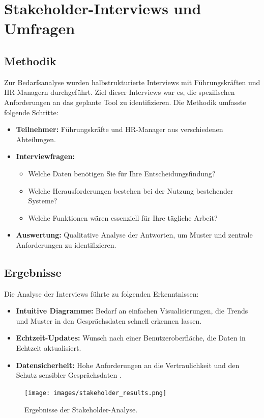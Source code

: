 \section{Stakeholder-Interviews und Umfragen}
\subsection{Methodik}
Zur Bedarfsanalyse wurden halbstrukturierte Interviews mit Führungskräften und HR-Managern durchgeführt. Ziel dieser Interviews war es, die spezifischen Anforderungen an das geplante Tool zu identifizieren. Die Methodik umfasste folgende Schritte:
\begin{itemize}
    \item \textbf{Teilnehmer:} Führungskräfte und HR-Manager aus verschiedenen Abteilungen.
    \item \textbf{Interviewfragen:}
    \begin{itemize}
        \item Welche Daten benötigen Sie für Ihre Entscheidungsfindung?
        \item Welche Herausforderungen bestehen bei der Nutzung bestehender Systeme?
        \item Welche Funktionen wären essenziell für Ihre tägliche Arbeit?
    \end{itemize}
    \item \textbf{Auswertung:} Qualitative Analyse der Antworten, um Muster und zentrale Anforderungen zu identifizieren.
\end{itemize}

\subsection{Ergebnisse}
Die Analyse der Interviews führte zu folgenden Erkenntnissen:
\begin{itemize}
    \item \textbf{Intuitive Diagramme:} Bedarf an einfachen Visualisierungen, die Trends und Muster in den Gesprächsdaten schnell erkennen lassen.
    \item \textbf{Echtzeit-Updates:} Wunsch nach einer Benutzeroberfläche, die Daten in Echtzeit aktualisiert.
    \item \textbf{Datensicherheit:} Hohe Anforderungen an die Vertraulichkeit und den Schutz sensibler Gesprächsdaten \cite{bryson2011employee}.
\end{itemize}

\begin{figure}[h!]
    \centering
    \texttt{[image: images/stakeholder\_results.png]}
    \caption{Ergebnisse der Stakeholder-Analyse.}
    \label{fig:stakeholder_results}
\end{figure}

